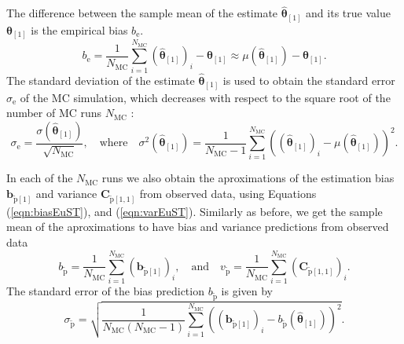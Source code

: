 The difference between the sample mean of the estimate $\widehat{\bm{\theta}}_{\left[1\right]}$ and its true value $\bm{\theta}_{\left[1\right]}$ is the empirical bias $b_\mathrm{e}$.
\begin{equation} {b}_\mathrm{e} = \frac{1}{N_{\mathrm{MC}}} \sum_{i=1}^{N_{\mathrm{MC}}}{ \left( \widehat{\bm{\theta}}_{\left[1\right]} \right)_i -  \bm{\theta}_{\left[1\right]} } \approx \mu \left( \widehat{\bm{\theta}}_{\left[1\right]} \right) - \bm{\theta}_{\left[1\right]} . \end{equation}
The standard deviation of the estimate $\widehat{\bm{\theta}}_{\left[1\right]}$ is used to obtain the standard error $\sigma_\mathrm{e}$ of the MC simulation, which decreases with respect to the square root of the number of MC runs $N_{\mathrm{MC}}$ \citep{Hammersley75}: 
\begin{equation} \sigma_\mathrm{e} = \frac{ \sigma \left( \widehat{\bm{\theta}}_{\left[1\right]} \right) }{\sqrt{N_{\mathrm{MC}}}}, \quad \mathrm{where} \quad \sigma^2 \left( \widehat{\bm{\theta}}_{\left[1\right]} \right) = \frac{1}{N_{\mathrm{MC}}-1} \sum_{i=1}^{N_{\mathrm{MC}}}{ \left( \left( \widehat{\bm{\theta}}_{\left[1\right]} \right)_i - \mu \left( \widehat{\bm{\theta}}_{\left[1\right]} \right) \right)^2 } . \label{eqn:stderr} \end{equation}

In each of the $N_{\mathrm{MC}}$ runs we also obtain the aproximations of the estimation bias $\mathbf{b}_{\widetilde{\mathrm{p}} \left[1\right]}$ and variance $\mathbf{C}_{\widetilde{\mathrm{p}} \left[1,1\right]}$  from observed data, using Equations (\ref{eqn:biasEuST}), and (\ref{eqn:varEuST}).
Similarly as before, we get the sample mean of the aproximations to have bias and variance predictions from observed data 
 \begin{equation} b_{\widetilde{\mathrm{p}}} = \frac{1}{N_{\mathrm{MC}}} \sum_{i=1}^{N_{\mathrm{MC}}}{ \left( \mathbf{b}_{\widetilde{\mathrm{p}} \left[1\right]} \right)_i } , \quad \mathrm{and} 
 \quad v_{\widetilde{\mathrm{p}}}  = \frac{1}{N_{\mathrm{MC}}} \sum_{i=1}^{N_{\mathrm{MC}}}{ \left( \mathbf{C}_{\widetilde{\mathrm{p}} \left[1,1\right]} \right)_i } . \end{equation} 
The standard error of the bias prediction $b_{\widetilde{\mathrm{p}}}$ is given by
\begin{equation} \sigma_{\widetilde{\mathrm{p}}} = \sqrt{ \frac{1}{N_{\mathrm{MC}} \left( N_{\mathrm{MC}}-1 \right)} \sum_{i=1}^{N_{\mathrm{MC}}} { \left( \left( \mathbf{b}_{\widetilde{\mathrm{p}} \left[1\right]} \right)_i - b_{\widetilde{\mathrm{p}}} \left( \widehat{\bm{\theta}}_{\left[1\right]} \right) \right)^2 } } . \end{equation}

